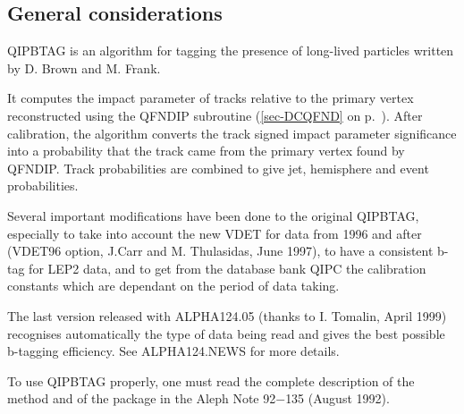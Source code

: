 \subsection{\label{sec-QIPBCA}General considerations}
\par
QIPBTAG is an algorithm for tagging the presence of long-lived particles written by  D. Brown and M. Frank.
\par
It computes the impact parameter of tracks relative to the primary vertex reconstructed
using the QFNDIP subroutine
(\ref{sec-DCQFND} on p.~\pageref{sec-DCQFND}).
 After calibration, the algorithm converts the track signed impact parameter significance
 into a probability that the track came from the primary vertex found by QFNDIP.
  Track probabilities are
 combined to give jet, hemisphere and event probabilities.
\par
Several important modifications have been done to the original QIPBTAG, especially to take into account the new VDET for data from
1996 and after (VDET96 option, J.Carr and M. Thulasidas, June 1997), to
have a consistent b-tag for LEP2 data, and to get from the database bank QIPC the calibration constants which are dependant on the 
period of data taking.

The last version released with ALPHA124.05 (thanks to I. Tomalin, April 1999) recognises automatically
 the type of data being read and 
gives the best possible b-tagging efficiency. See ALPHA124.NEWS for more details.


\par
To use QIPBTAG properly, one must read the complete description of the method and of
the package in the Aleph Note 92$-$135 (August 1992).
